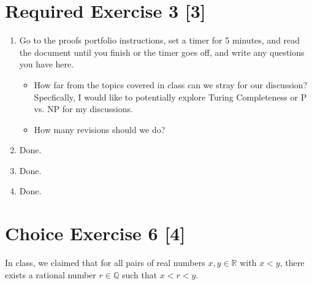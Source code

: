 \documentclass{article}
\begin{document}
\section*{Required Exercise 3 [3]}
\begin{enumerate}
    \item {
        Go to the proofs portfolio instructions, set a timer for 5 minutes, and read the document until you finish or the timer goes off, and write any questions you have here.
        \begin{itemize}
            \item {
                How far from the topics covered in class can we stray for our discussion?
                Specfically, I would like to potentially explore Turing Completeness 
                or P vs. NP for my discussions. 
            }

            \item{
                How many revisions should we do? 
            }
        \end{itemize}
    }

    \item {
        Done.
    }

    \item {
        Done.
    }

    \item {
        Done.
    }
\end{enumerate}

\section*{Choice Exercise 6 [4]}

In class, we claimed that for all pairs of real numbers \(x, y \in \mathbb{R}\)
with \(x < y\), there exists a rational number \(r \in \mathbb{Q}\) such that \(x<r<y\).
\end{document}
